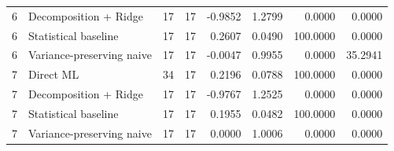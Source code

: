\begin{tabular}{rlrrrrrr}
6 & Decomposition + Ridge & 17 & 17 & -0.9852 & 1.2799 & 0.0000 & 0.0000 \\
6 & Statistical baseline & 17 & 17 & 0.2607 & 0.0490 & 100.0000 & 0.0000 \\
6 & Variance-preserving naive & 17 & 17 & -0.0047 & 0.9955 & 0.0000 & 35.2941 \\
7 & Direct ML & 34 & 17 & 0.2196 & 0.0788 & 100.0000 & 0.0000 \\
7 & Decomposition + Ridge & 17 & 17 & -0.9767 & 1.2525 & 0.0000 & 0.0000 \\
7 & Statistical baseline & 17 & 17 & 0.1955 & 0.0482 & 100.0000 & 0.0000 \\
7 & Variance-preserving naive & 17 & 17 & 0.0000 & 1.0006 & 0.0000 & 0.0000 \\
\bottomrule
\end{tabular}
